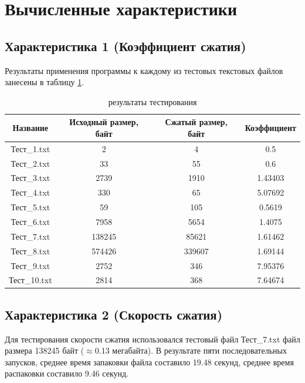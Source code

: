 \documentclass[a4paper,oneside]{article}
\theoremstyle{definition}
\begin{document}
\section{Вычисленные характеристики}

\subsection{Характеристика 1 (Коэффициент сжатия)}

Результаты применения программы к каждому из тестовых текстовых файлов занесены
в таблицу \ref{tbl:results}.

\begin{table}[H]
  \small
  \centering
  \begin{tabular}{|c|c|c|c|}
    \hline
    Название     & Исходный размер, байт & Сжатый размер, байт & Коэффициент \\ \hline \hline
    Тест\_1.txt  & 2           &      4      & 0.5     \\ \hline
    Тест\_2.txt  & 33          &     55      & 0.6     \\ \hline
    Тест\_3.txt  & 2739        &   1910      & 1.43403 \\ \hline
    Тест\_4.txt  & 330         &     65      & 5.07692 \\ \hline
    Тест\_5.txt  & 59          &    105      & 0.5619  \\ \hline
    Тест\_6.txt  & 7958        &   5654      & 1.4075  \\ \hline
    Тест\_7.txt  & 138245      &  85621      & 1.61462 \\ \hline
    Тест\_8.txt  & 574426      & 339607      & 1.69144 \\ \hline
    Тест\_9.txt  & 2752        &    346      & 7.95376 \\ \hline
    Тест\_10.txt & 2814        &    368      & 7.64674 \\ \hline
  \end{tabular}
  \caption{результаты тестирования}
  \label{tbl:results}
\end{table}

\subsection{Характеристика 2 (Скорость сжатия)}

Для тестирования скорости сжатия использовался тестовый файл Тест_7.txt
файл размера 138245 байт ($\approx$0.13 мегабайта). В результате пяти
последовательных запусков, среднее время запаковки файла составило 19.48
секунд, среднее время распаковки составило 9.46 секунд.
\end{document}
